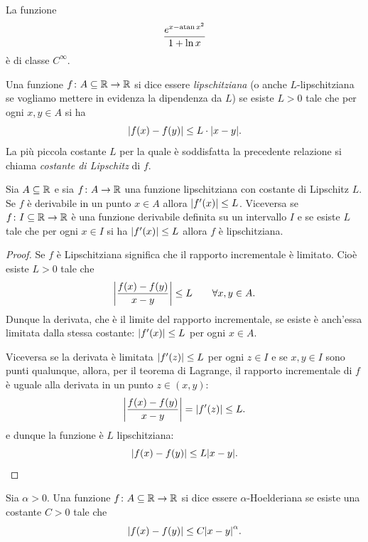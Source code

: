 \begin{example}
  La funzione 
  \[
    \frac{e^{x-\operatorname{atan} x^2}}{1+\ln x}
  \]
  è di classe $C^\infty$.
\end{example}

\begin{definition}
\mymark{**}
Una funzione $f\colon A\subseteq {\mathbb R} \to {\mathbb R}$ si dice essere 
\emph{lipschitziana} (o anche $L$-lipschitziana se vogliamo mettere 
in evidenza la dipendenza da $L$) se esiste $L>0$ tale che
per ogni $x,y\in A$ si ha 
\[
  {\left|f(x) - f(y)\right|} \le L\cdot  {\left|x-y\right|}.
\]
La più piccola costante $L$ per la quale è soddisfatta la precedente relazione si chiama \emph{costante di Lipschitz}
di $f$.
\end{definition}

\begin{theorem}
\mymark{**}
Sia $A\subseteq {\mathbb R}$
e sia $f\colon A \to {\mathbb R}$ una funzione lipschitziana
con costante di Lipschitz $L$.
Se $f$ è derivabile in un punto $x\in A$ allora ${\left|f'(x)\right|}\le L$.
Viceversa se $f\colon I \subseteq {\mathbb R} \to {\mathbb R}$ è una funzione derivabile 
definita su un intervallo $I$
e se esiste $L$ tale che per ogni $x\in I$ si ha ${\left|f'(x)\right|}\le L$ 
allora $f$ è lipschitziana.
\end{theorem}
%
\begin{proof}
Se $f$ è Lipschitziana significa che il rapporto incrementale è limitato.
Cioè esiste $L>0$ tale che
\[
  {\left|\frac{f(x) - f(y)}{x-y}\right|} \le L \qquad \forall x,y\in A.
\]
Dunque la derivata, che è il limite del rapporto incrementale, se esiste è anch'essa limitata
dalla stessa costante: ${\left|f'(x)\right|}\le L$ per ogni $x \in A$.

Viceversa se la derivata è limitata ${\left|f'(z)\right|}\le L$ per ogni $z \in I$ e se $x,y\in I$ sono punti qualunque,
allora, per il teorema di Lagrange, il rapporto incrementale di $f$ è uguale alla derivata in un punto $z\in(x,y)$:
\[
  {\left|\frac{f(x) - f(y)}{x-y}\right|} = {\left|f'(z)\right|} \le L.
\]
e dunque la funzione è $L$ lipschitziana:
\[
  {\left|f(x)- f(y)\right|} \le L {\left|x-y\right|}.
\]
\end{proof}

\begin{definition}
Sia $\alpha>0$.
Una funzione $f\colon A \subseteq {\mathbb R} \to {\mathbb R}$ si dice essere $\alpha$-Hoelderiana se
esiste una costante $C>0$ tale che
\begin{equation}\label{eq:2964536}
  {\left|f(x) - f(y)\right|} \le C {\left|x-y\right|}^\alpha.
\end{equation}
\end{definition}

